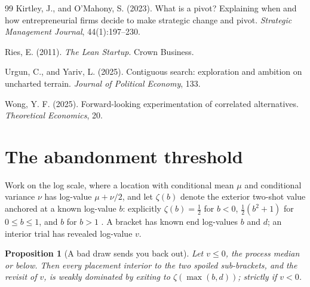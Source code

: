 \documentclass[11pt]{article}
\theoremstyle{itheads}
\newtheorem{proposition}{Proposition}
\begin{document}
\begin{thebibliography}{99}
Kirtley, J., and O'Mahony, S. (2023).
What is a pivot? Explaining when and how entrepreneurial firms decide
to make strategic change and pivot.
\emph{Strategic Management Journal}, 44(1):197--230.

Ries, E. (2011).
\emph{The Lean Startup}. Crown Business.

Urgun, C., and Yariv, L. (2025).
Contiguous search: exploration and ambition on uncharted terrain.
\emph{Journal of Political Economy}, 133.

Wong, Y. F. (2025).
Forward-looking experimentation of correlated alternatives.
\emph{Theoretical Economics}, 20.

\end{thebibliography}

\appendix

\section{The abandonment threshold}

Work on the log scale, where a location with conditional mean $\mu$
and conditional variance $\nu$ has log-value $\mu + \nu/2$, and let
$\zeta(b)$ denote the exterior two-shot value anchored at a known
log-value $b$: explicitly $\zeta(b) = \tfrac12$ for $b < 0$,
$\tfrac12(b^2+1)$ for $0 \le b \le 1$, and $b$ for $b > 1$
\citep{cotton2026grass}. A bracket has known end log-values $b$ and
$d$; an interior trial has revealed log-value $v$.

\begin{proposition}[A bad draw sends you back out]\label{prop:exit}
Let $v \le 0$, the process median or below. Then every placement
interior to the two spoiled sub-brackets, and the revisit of $v$, is
weakly dominated by exiting to $\zeta(\max(b,d))$; strictly if
$v < 0$.
\end{proposition}
\end{document}

